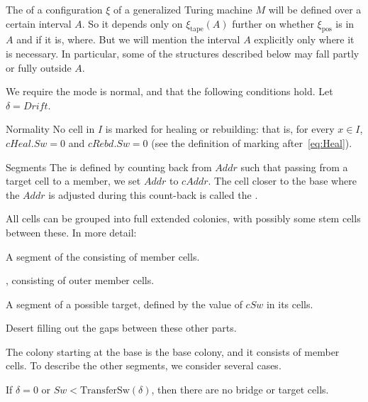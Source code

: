 \documentclass[12pt]{memoir}
\newcommand{\fld}[1]{\ensuremath{\textit{#1}}}
\newcommand{\pos}{\mathrm{pos}}
\newcommand{\Addr}{\fld{Addr}}
\newcommand{\cAddr}{\fld{cAddr}}
\newcommand{\cRebd}{\fld{cRebd}}
\newcommand{\Drift}{\fld{Drift}}
\newcommand{\cHeal}{\fld{cHeal}}
\newcommand{\Sweep}{\fld{Sw}}
\newcommand{\cSweep}{\fld{cSw}}
\newcommand{\tape}{\mathrm{tape}}
\newcommand{\TransferSw}{\mathrm{TransferSw}}
\begin{document}
\begin{definition}\label{def:healthy}
The  of a configuration \( \xi \) of a generalized Turing machine 
\( M \) will be defined over a certain interval \( A \).
So it depends only on \( \xi_{\tape}(A) \) further on whether \( \xi_{\pos} \) is in \( A \) and
if it is, where.
But we will mention the interval \( A \) explicitly only where it is necessary.
In particular, some of the structures described below may fall partly or fully
outside \( A \).

We require the mode is normal, and that the following conditions hold.
Let \( \delta = \Drift \).

\begin{flushdescription}

\item[Normality]
  No cell in \( I \) is marked for healing or rebuilding:
  that is, for every \( x \in I \), \( \cHeal.\Sweep = 0 \) and
  \( \cRebd.\Sweep = 0 \)  (see the definition of marking after~\eqref{eq:Heal}).

\item[Segments]
  The  is defined by counting back from \( \Addr \) such that
  passing from a target cell to a member, we set \( \Addr \) to \( \cAddr \).
  The cell closer to the base where the \( \Addr \) is adjusted during
  this count-back is called the .

  All cells can be grouped into full extended colonies,
  with possibly some stem cells between these.
  In more detail:
  \begin{bullets}
  \item A segment of the  consisting of member cells.
  \item {}, consisting of outer member cells.
  \item A segment of a possible target, defined by the value of \( \cSweep \) in its cells.
  \item Desert filling out the gaps between these other parts.
  \end{bullets}

  The colony starting at the base is the base colony, and it consists of member cells.
  To describe the other segments, we consider several cases.
  \begin{bullets}
  \item 
    If \( \delta=0 \) or \( \Sweep < \TransferSw(\delta) \), 
    then there are no bridge or target cells.


\end{bullets}
\end{flushdescription}
\end{definition}
\end{document}
